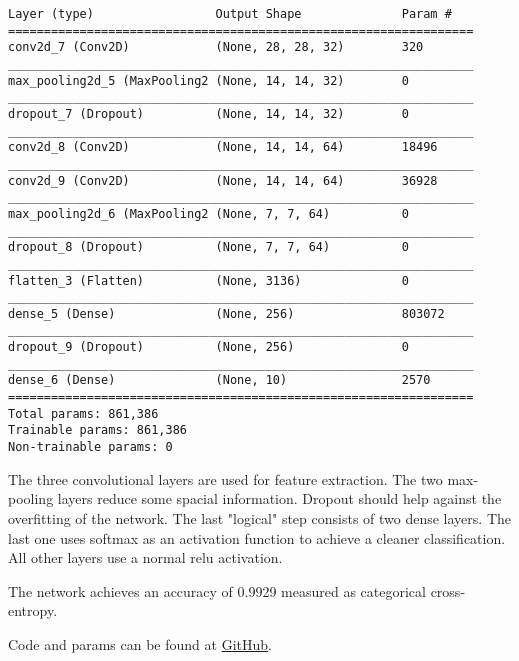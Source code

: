 \documentclass[a4paper, 11pt]{article}
\begin{document}
\begin{verbatim}
Layer (type)                 Output Shape              Param #
=================================================================
conv2d_7 (Conv2D)            (None, 28, 28, 32)        320
_________________________________________________________________
max_pooling2d_5 (MaxPooling2 (None, 14, 14, 32)        0
_________________________________________________________________
dropout_7 (Dropout)          (None, 14, 14, 32)        0
_________________________________________________________________
conv2d_8 (Conv2D)            (None, 14, 14, 64)        18496
_________________________________________________________________
conv2d_9 (Conv2D)            (None, 14, 14, 64)        36928
_________________________________________________________________
max_pooling2d_6 (MaxPooling2 (None, 7, 7, 64)          0
_________________________________________________________________
dropout_8 (Dropout)          (None, 7, 7, 64)          0
_________________________________________________________________
flatten_3 (Flatten)          (None, 3136)              0
_________________________________________________________________
dense_5 (Dense)              (None, 256)               803072
_________________________________________________________________
dropout_9 (Dropout)          (None, 256)               0
_________________________________________________________________
dense_6 (Dense)              (None, 10)                2570
=================================================================
Total params: 861,386
Trainable params: 861,386
Non-trainable params: 0
\end{verbatim}

The three convolutional layers are used for feature extraction.
The two max-pooling layers reduce some spacial information.
Dropout should help against the overfitting of the network.
The last "logical" step consists of two dense layers.
The last one uses softmax as an activation function to achieve a cleaner classification.
All other layers use a normal relu activation.

The network achieves an accuracy of 0.9929 measured as categorical cross-entropy.

Code and params can be found at \href{https://github.com/Flova/DAIS/blob/master/%C3%9Cbung 4/MNIST_Keras.ipynb}{GitHub}.
\end{document}
